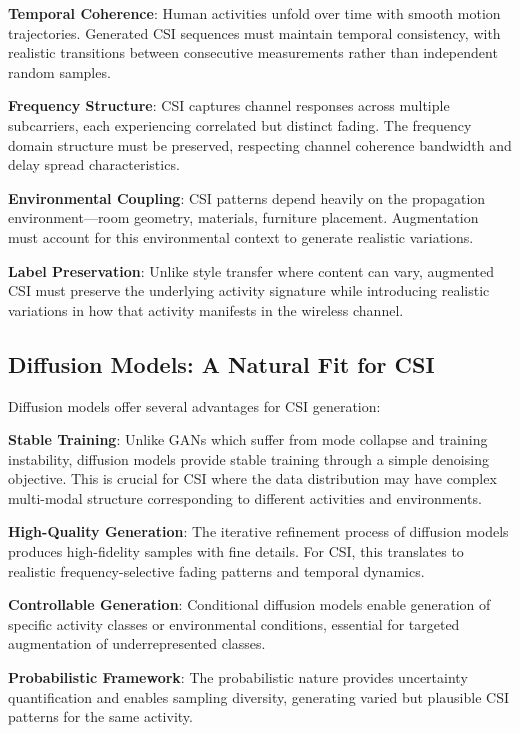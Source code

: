 \documentclass[journal]{IEEEtran}
\begin{document}
\textbf{Temporal Coherence}: Human activities unfold over time with smooth motion trajectories. Generated CSI sequences must maintain temporal consistency, with realistic transitions between consecutive measurements rather than independent random samples.

\textbf{Frequency Structure}: CSI captures channel responses across multiple subcarriers, each experiencing correlated but distinct fading. The frequency domain structure must be preserved, respecting channel coherence bandwidth and delay spread characteristics.

\textbf{Environmental Coupling}: CSI patterns depend heavily on the propagation environment—room geometry, materials, furniture placement. Augmentation must account for this environmental context to generate realistic variations.

\textbf{Label Preservation}: Unlike style transfer where content can vary, augmented CSI must preserve the underlying activity signature while introducing realistic variations in how that activity manifests in the wireless channel.

\subsection{Diffusion Models: A Natural Fit for CSI}

Diffusion models offer several advantages for CSI generation:

\textbf{Stable Training}: Unlike GANs which suffer from mode collapse and training instability, diffusion models provide stable training through a simple denoising objective. This is crucial for CSI where the data distribution may have complex multi-modal structure corresponding to different activities and environments.

\textbf{High-Quality Generation}: The iterative refinement process of diffusion models produces high-fidelity samples with fine details. For CSI, this translates to realistic frequency-selective fading patterns and temporal dynamics.

\textbf{Controllable Generation}: Conditional diffusion models enable generation of specific activity classes or environmental conditions, essential for targeted augmentation of underrepresented classes.

\textbf{Probabilistic Framework}: The probabilistic nature provides uncertainty quantification and enables sampling diversity, generating varied but plausible CSI patterns for the same activity.
\end{document}

